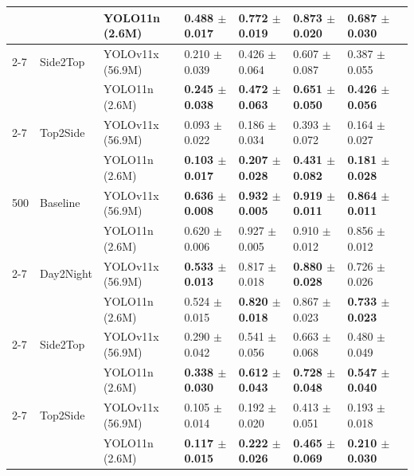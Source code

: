 \begin{table}[H]
{\begin{tabular}{llllllll}
            &           & YOLO11n (2.6M) & \textbf{0.488 $\pm$ 0.017} & \textbf{0.772 $\pm$ 0.019} & \textbf{0.873 $\pm$ 0.020} & \textbf{0.687 $\pm$ 0.030} \\
        \cmidrule{2-7}
            & Side2Top  & YOLOv11x (56.9M) & 0.210 $\pm$ 0.039 & 0.426 $\pm$ 0.064 & 0.607 $\pm$ 0.087 & 0.387 $\pm$ 0.055 \\
            &           & YOLO11n (2.6M) & \textbf{0.245 $\pm$ 0.038} & \textbf{0.472 $\pm$ 0.063} & \textbf{0.651 $\pm$ 0.050} & \textbf{0.426 $\pm$ 0.056} \\
        \cmidrule{2-7}
            & Top2Side  & YOLOv11x (56.9M) & 0.093 $\pm$ 0.022 & 0.186 $\pm$ 0.034 & 0.393 $\pm$ 0.072 & 0.164 $\pm$ 0.027 \\
            &           & YOLO11n (2.6M) & \textbf{0.103 $\pm$ 0.017} & \textbf{0.207 $\pm$ 0.028} & \textbf{0.431 $\pm$ 0.082} & \textbf{0.181 $\pm$ 0.028} \\
        \midrule
        500 & Baseline  & YOLOv11x (56.9M) & \textbf{0.636 $\pm$ 0.008} & \textbf{0.932 $\pm$ 0.005} & \textbf{0.919 $\pm$ 0.011} & \textbf{0.864 $\pm$ 0.011} \\
            &           & YOLO11n (2.6M) & 0.620 $\pm$ 0.006 & 0.927 $\pm$ 0.005 & 0.910 $\pm$ 0.012 & 0.856 $\pm$ 0.012 \\
        \cmidrule{2-7}
            & Day2Night & YOLOv11x (56.9M) & \textbf{0.533 $\pm$ 0.013} & 0.817 $\pm$ 0.018 & \textbf{0.880 $\pm$ 0.028} & 0.726 $\pm$ 0.026 \\
            &           & YOLO11n (2.6M) & 0.524 $\pm$ 0.015 & \textbf{0.820 $\pm$ 0.018} & 0.867 $\pm$ 0.023 & \textbf{0.733 $\pm$ 0.023} \\
        \cmidrule{2-7}
            & Side2Top  & YOLOv11x (56.9M) & 0.290 $\pm$ 0.042 & 0.541 $\pm$ 0.056 & 0.663 $\pm$ 0.068 & 0.480 $\pm$ 0.049 \\
            &           & YOLO11n (2.6M) & \textbf{0.338 $\pm$ 0.030} & \textbf{0.612 $\pm$ 0.043} & \textbf{0.728 $\pm$ 0.048} & \textbf{0.547 $\pm$ 0.040} \\
        \cmidrule{2-7}
            & Top2Side  & YOLOv11x (56.9M) & 0.105 $\pm$ 0.014 & 0.192 $\pm$ 0.020 & 0.413 $\pm$ 0.051 & 0.193 $\pm$ 0.018 \\
            &           & YOLO11n (2.6M) & \textbf{0.117 $\pm$ 0.015} & \textbf{0.222 $\pm$ 0.026} & \textbf{0.465 $\pm$ 0.069} & \textbf{0.210 $\pm$ 0.030} \\
        \bottomrule
    \end{tabular}
    }
    \label{tab:study1}
\end{table}

